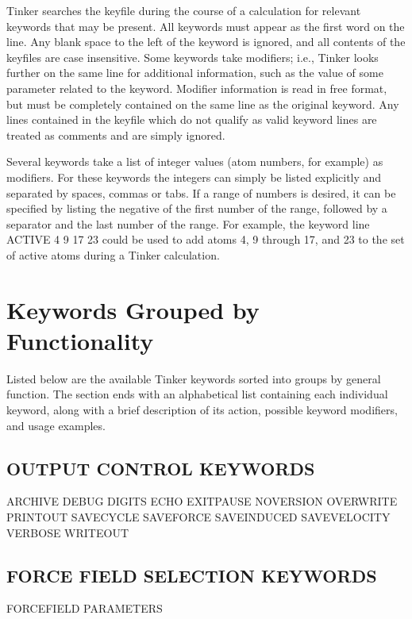 \documentclass[letterpaper,11pt,english]{sphinxmanual}
\begin{document}
Tinker searches the keyfile during the course of a calculation for relevant keywords that may be present. All keywords must appear as the first word on the line. Any blank space to the left of the keyword is ignored, and all contents of the keyfiles are case insensitive. Some keywords take modifiers; i.e., Tinker looks further on the same line for additional information, such as the value of some parameter related to the keyword. Modifier information is read in free format, but must be completely contained on the same line as the original keyword. Any lines contained in the keyfile which do not qualify as valid keyword lines are treated as comments and are simply ignored.

Several keywords take a list of integer values (atom numbers, for example) as modifiers. For these keywords the integers can simply be listed explicitly and separated by spaces, commas or tabs. If a range of numbers is desired, it can be specified by listing the negative of the first number of the range, followed by a separator and the last number of the range. For example, the keyword line ACTIVE 4 \sphinxhyphen{}9 17 23 could be used to add atoms 4, 9 through 17, and 23 to the set of active atoms during a Tinker calculation.


\section{Keywords Grouped by Functionality}
\label{\detokenize{text/keywords:keywords-grouped-by-functionality}}
Listed below are the available Tinker keywords sorted into groups by general function. The section ends with an alphabetical list containing each individual keyword, along with a brief description of its action, possible keyword modifiers, and usage examples.


\subsection{OUTPUT CONTROL KEYWORDS}
\label{\detokenize{text/keywords:output-control-keywords}}
ARCHIVE DEBUG   DIGITS
ECHO    EXIT\sphinxhyphen{}PAUSE      NOVERSION
OVERWRITE       PRINTOUT        SAVE\sphinxhyphen{}CYCLE
SAVE\sphinxhyphen{}FORCE      SAVE\sphinxhyphen{}INDUCED    SAVE\sphinxhyphen{}VELOCITY
VERBOSE WRITEOUT


\subsection{FORCE FIELD SELECTION KEYWORDS}
\label{\detokenize{text/keywords:force-field-selection-keywords}}
FORCEFIELD      PARAMETERS
\end{document}
